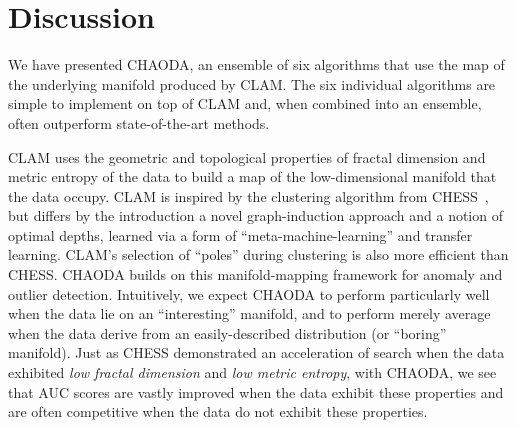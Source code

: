 \section{Discussion}
\label{sec:discussion}

We have presented CHAODA, an ensemble of six algorithms that use the map of the underlying manifold produced by CLAM\@.
The six individual algorithms are simple to implement on top of CLAM and, when combined into an ensemble, often outperform state-of-the-art methods.

CLAM uses the geometric and topological properties of fractal dimension and metric entropy of the data to build a map of the low-dimensional manifold that the data occupy.
CLAM is inspired by the clustering algorithm from CHESS~\cite{ishaq2019clustered}, but differs by the introduction a novel graph-induction approach and a notion of optimal depths, learned via a form of ``meta-machine-learning'' and transfer learning.
CLAM's selection of ``poles'' during clustering is also more efficient than CHESS.
CHAODA builds on this manifold-mapping framework for anomaly and outlier detection.
Intuitively, we expect CHAODA to perform particularly well when the data lie on an ``interesting'' manifold, and to perform merely average when the data derive from an easily-described distribution (or ``boring'' manifold).
Just as CHESS demonstrated an acceleration of search when the data exhibited \emph{low fractal dimension} and \emph{low metric entropy}, with CHAODA, we see that AUC scores are vastly improved when the data exhibit these properties and are often competitive when the data do not exhibit these properties.




